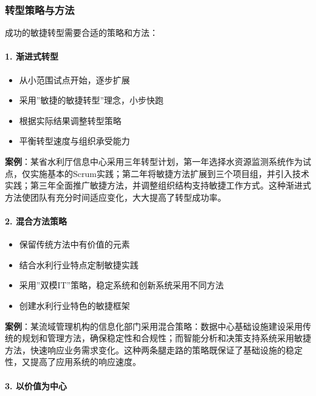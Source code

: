 \subsubsection{转型策略与方法}\label{ux8f6cux578bux7b56ux7565ux4e0eux65b9ux6cd5}

成功的敏捷转型需要合适的策略和方法：

\paragraph{1. 渐进式转型}\label{ux6e10ux8fdbux5f0fux8f6cux578b}

\begin{itemize}
\tightlist
\item
  从小范围试点开始，逐步扩展
\item
  采用''敏捷的敏捷转型''理念，小步快跑
\item
  根据实际结果调整转型策略
\item
  平衡转型速度与组织承受能力
\end{itemize}

\textbf{案例}：某省水利厅信息中心采用三年转型计划，第一年选择水资源监测系统作为试点，仅实施基本的Scrum实践；第二年将敏捷方法扩展到三个项目组，并引入技术实践；第三年全面推广敏捷方法，并调整组织结构支持敏捷工作方式。这种渐进式方法使团队有充分时间适应变化，大大提高了转型成功率。

\paragraph{2. 混合方法策略}\label{ux6df7ux5408ux65b9ux6cd5ux7b56ux7565}

\begin{itemize}
\tightlist
\item
  保留传统方法中有价值的元素
\item
  结合水利行业特点定制敏捷实践
\item
  采用''双模IT''策略，稳定系统和创新系统采用不同方法
\item
  创建水利行业特色的敏捷框架
\end{itemize}

\textbf{案例}：某流域管理机构的信息化部门采用混合策略：数据中心基础设施建设采用传统的规划和管理方法，确保稳定性和合规性；而智能分析和决策支持系统采用敏捷方法，快速响应业务需求变化。这种两条腿走路的策略既保证了基础设施的稳定性，又提高了应用系统的响应速度。

\paragraph{3. 以价值为中心}\label{ux4ee5ux4ef7ux503cux4e3aux4e2dux5fc3}

